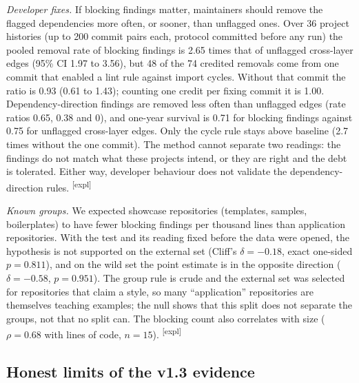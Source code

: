 \documentclass[10pt,a4paper]{article}
\newcommand{\explor}{\textsuperscript{\textsf{\tiny[expl]}}}
\begin{document}
\emph{Developer fixes.} If blocking findings matter, maintainers should remove the flagged dependencies more often,
or sooner, than unflagged ones. Over 36 project histories (up to 200 commit pairs each, protocol committed before
any run) the pooled removal rate of blocking findings is 2.65 times that of unflagged cross-layer edges (95\% CI
1.97 to 3.56), but 48 of the 74 credited removals come from one commit that enabled a lint rule against import
cycles. Without that commit the ratio is 0.93 (0.61 to 1.43); counting one credit per fixing commit it is 1.00.
Dependency-direction findings are removed less often than unflagged edges (rate ratios 0.65, 0.38 and 0), and
one-year survival is 0.71 for blocking findings against 0.75 for unflagged cross-layer edges. Only the cycle rule
stays above baseline (2.7 times without the one commit). The method cannot separate two readings: the findings do
not match what these projects intend, or they are right and the debt is tolerated. Either way, developer behaviour
does not validate the dependency-direction rules. \explor{}

\emph{Known groups.} We expected showcase repositories (templates, samples, boilerplates) to have fewer blocking
findings per thousand lines than application repositories. With the test and its reading fixed before the data were
opened, the hypothesis is not supported on the external set (Cliff's $\delta = -0.18$, exact one-sided
$p = 0.811$), and on the wild set the point estimate is in the opposite direction ($\delta = -0.58$,
$p = 0.951$). The group rule is crude and the external set was selected for repositories that claim a style, so many
``application'' repositories are themselves teaching examples; the null shows that this split does not separate the
groups, not that no split can. The blocking count also correlates with size ($\rho = 0.68$ with lines of code,
$n = 15$). \explor{}

\subsection{Honest limits of the v1.3 evidence}\label{sec:v13-limits}
\end{document}

